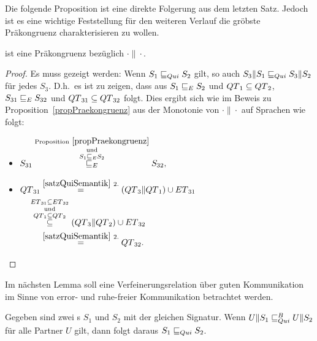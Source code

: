 Die folgende Proposition ist eine direkte Folgerung aus dem letzten Satz.
Jedoch ist es eine wichtige Feststellung für den weiteren Verlauf die gröbste
Präkongruenz charakterisieren zu wollen.

\begin{prop}
  \label{propQuiPrae}
  \QRel{} ist eine Präkongruenz bezüglich $\cdot\|\cdot$.
\end{prop}

\begin{proof}
  Es muss gezeigt werden: Wenn $S_1\sqsubseteq _{Qui} S_2$ gilt, so auch
  $S_3\|S_1\sqsubseteq _{Qui} S_3\|S_2$ für jedes $S_3$. D.h.\ es ist zu zeigen, dass aus
  $S_1\sqsubseteq _E S_2$ und $QT{}_1\subseteq QT{}_2$, $S_{31}\sqsubseteq _E S_{32}$ und
  $QT{}_{31}\subseteq QT{}_{32}$ folgt. Dies ergibt sich wie im Beweis
  zu Proposition~\ref{propPraekongruenz} aus der Monotonie von $\cdot\|\cdot$
  auf Sprachen wie folgt:
  \begin{itemize}
    \item $\begin{aligned}[t]
        S_{31} \overset{\mathrm{Proposition}~
        \ref{propPraekongruenz}}{\overset{\mathrm{und}}{\overset{S_1\sqsubseteq _E
    S_2}{\sqsubseteq _E}}} S_{32},
    \end{aligned}$
    \item $\begin{aligned}[t]
        \QT{}_{31} &\overset{\ref{satzQuiSemantik}~2.}{=}
        (\QT{}_3\|\QT{}_1)\cup \ET{}_{31}\\
        &\hspace{-0.5cm}\overset{\ET{}_{31}\subseteq
      \ET{}_{32}}{\overset{\mathrm{und}}{\overset{\QT{}_1\subseteq
      \QT{}_2}{\subseteq}}} (\QT{}_3\|\QT{}_2) \cup \ET{}_{32}\\
        &\overset{\ref{satzQuiSemantik}~2.}{=} \QT{}_{32}.
    \end{aligned}$
  \end{itemize}
\end{proof}

Im nächsten Lemma soll eine Verfeinerungsrelation über guten Kommunikation im
Sinne von error- und ruhe-freier Kommunikation betrachtet werden.

\begin{lem}
  \label{lemQuiVerfeinerung}
  Gegeben sind zwei \EIO{}s $S_1$ und $S_2$ mit der gleichen Signatur. Wenn
  $U\|S_1\sqsubseteq _{Qui}^B U\|S_2$ für alle Partner $U$ gilt, dann folgt daraus $S_1\sqsubseteq _{Qui}
  S_2$.
\end{lem}

